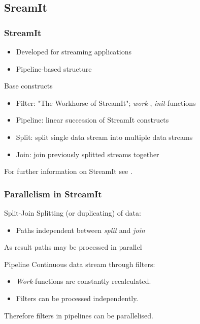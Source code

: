 \documentclass{beamer}
\begin{document}
\subsection{SreamIt}
\begin{frame}
\frametitle{StreamIt}
	\begin{itemize}
		\item Developed for streaming applications
		\item Pipeline-based structure
	\end{itemize}
	\begin{block}{Base constructs}
		\begin{itemize}
			\item Filter: "The Workhorse of StreamIt"; \textit{work}-, \textit{init}-functions 
			\item Pipeline: linear succession of StreamIt constructs
			\item Split: split single data stream into multiple data streams
			\item Join: join previously splitted streams together
		\end{itemize}
	\end{block}
	For further information on StreamIt see \cite{streamIt}.
\end{frame}

\begin{frame}
\frametitle{Parallelism in StreamIt}
	\begin{block}{Split-Join}
		Splitting (or duplicating) of data:\\
		\begin{itemize}
			\item Paths independent between \textit{split} and \textit{join}
		\end{itemize}
		As result paths may be processed in parallel
	\end{block}
	\begin{block}{Pipeline}
		Continuous data stream through filters:\\
		\begin{itemize}
			\item \textit{Work}-functions are constantly recalculated.
			\item Filters can be processed independently.
		\end{itemize}
		Therefore filters in pipelines can be parallelised.
	\end{block}
\end{frame}
\end{document}
